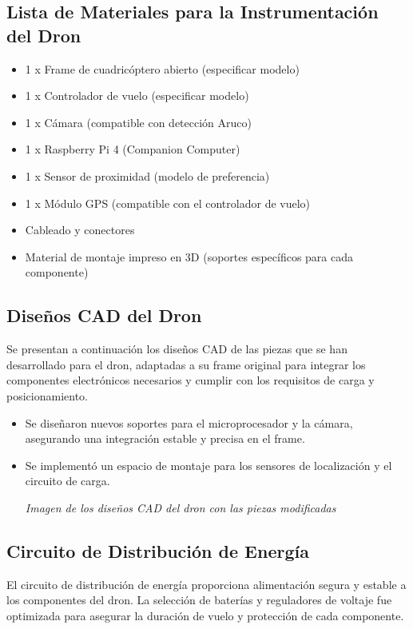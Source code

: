\subsection{Lista de Materiales para la Instrumentación del Dron} 
    \begin{itemize} 
        \item 1 x Frame de cuadricóptero abierto (especificar modelo) 
        \item 1 x Controlador de vuelo (especificar modelo) 
        \item 1 x Cámara (compatible con detección Aruco) 
        \item 1 x Raspberry Pi 4 (Companion Computer) 
        \item 1 x Sensor de proximidad (modelo de preferencia) 
        \item 1 x Módulo GPS (compatible con el controlador de vuelo) 
        \item Cableado y conectores 
        \item Material de montaje impreso en 3D (soportes específicos para cada componente) 
    \end{itemize}

\subsection{Diseños CAD del Dron} 
Se presentan a continuación los diseños CAD de las piezas que se han desarrollado para el dron, adaptadas a su frame original para integrar los componentes electrónicos necesarios y cumplir con los requisitos de carga y posicionamiento.

    \begin{itemize} 
        \item Se diseñaron nuevos soportes para el microprocesador y la cámara, asegurando una integración estable y precisa en el frame. 
        \item Se implementó un espacio de montaje para los sensores de localización y el circuito de carga. 
        \begin{center} 
            \textit{Imagen de los diseños CAD del dron con las piezas modificadas} 
        \end{center} 
    \end{itemize}



\subsection{Circuito de Distribución de Energía} 
El circuito de distribución de energía proporciona alimentación segura y estable a los componentes del dron. La selección de baterías y reguladores de voltaje fue optimizada para asegurar la duración de vuelo y protección de cada componente.

